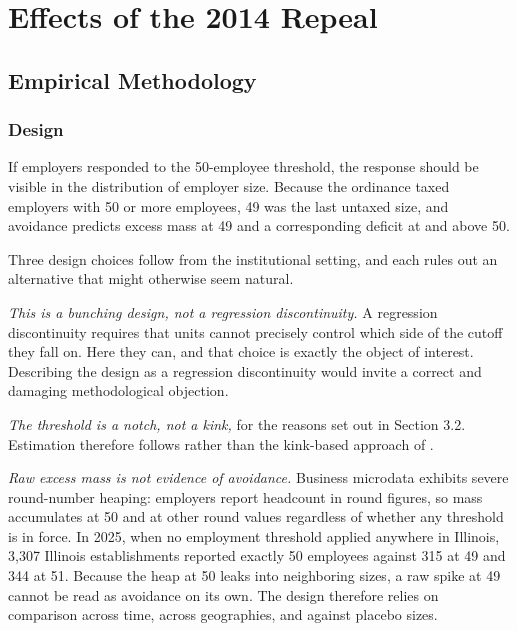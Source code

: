 \documentclass[12pt,letterpaper]{article}
\newif\ifdraft
\newcommand{\TODO}[1]{\ifdraft\textcolor{red}{\textbf{[TODO: #1]}}\fi}
\begin{document}
\TODO{Document the review method here: what was searched, inclusion criteria, how studies were weighted. State clearly what transfers to Chicago and what does not.}

\section{Effects of the 2014 Repeal}

\subsection{Empirical Methodology}

\subsubsection{Design}

If employers responded to the 50-employee threshold, the response should be visible in the distribution of employer size. Because the ordinance taxed employers with 50 or more employees, 49 was the last untaxed size, and avoidance predicts excess mass at 49 and a corresponding deficit at and above 50.

Three design choices follow from the institutional setting, and each rules out an alternative that might otherwise seem natural.

\textit{This is a bunching design, not a regression discontinuity.} A regression discontinuity requires that units cannot precisely control which side of the cutoff they fall on. Here they can, and that choice is exactly the object of interest. Describing the design as a regression discontinuity would invite a correct and damaging methodological objection.

\textit{The threshold is a notch, not a kink,} for the reasons set out in Section 3.2. Estimation therefore follows \citet{kleven2013} rather than the kink-based approach of \citet{saez2010}.

\textit{Raw excess mass is not evidence of avoidance.} Business microdata exhibits severe round-number heaping: employers report headcount in round figures, so mass accumulates at 50 and at other round values regardless of whether any threshold is in force. In 2025, when no employment threshold applied anywhere in Illinois, 3,307 Illinois establishments reported exactly 50 employees against 315 at 49 and 344 at 51. Because the heap at 50 leaks into neighboring sizes, a raw spike at 49 cannot be read as avoidance on its own. The design therefore relies on comparison across time, across geographies, and against placebo sizes.
\end{document}

